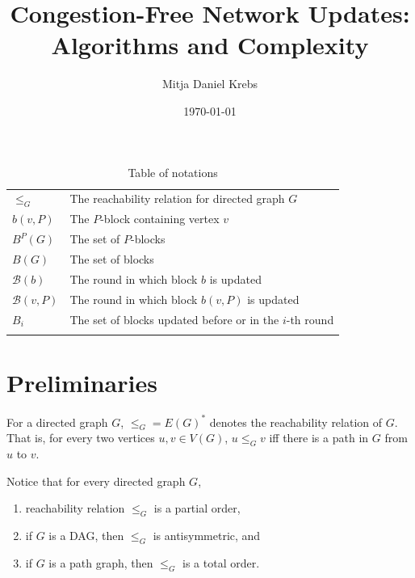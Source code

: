 \documentclass[fontsize=11pt,paper=a4]{book}
\author{Mitja Daniel Krebs}
\date{\today}
\title{Congestion-Free Network Updates: Algorithms and Complexity}
\begin{document}
\maketitle
\tableofcontents

\begin{table}[htbp]
\caption{Table of notations}
\centering
\begin{tabular}{ll}
\hyperref[org1d7d3be]{\(\leq_G\)} & The reachability relation for directed graph \(G\)\\[0pt]
\hyperref[org0c45832]{\(b(v,P)\)} & The \(P\)-block containing vertex \(v\)\\[0pt]
\hyperref[org881382e]{\(B^P(G)\)} & The set of \(P\)-blocks\\[0pt]
\hyperref[org096be0d]{\(B(G)\)} & The set of blocks\\[0pt]
\hyperref[orgdbe2a03]{\(\mathcal{B}(b)\)} & The round in which block \(b\) is updated\\[0pt]
\hyperref[orgdc3d476]{\(\mathcal{B}(v,P)\)} & The round in which block \(b(v,P)\) is updated\\[0pt]
\hyperref[org94a692e]{\(B_i\)} & The set of blocks updated before or in the \(i\)-th round\\[0pt]
 & \\[0pt]
\end{tabular}
\end{table}

\part{Preliminaries}
\label{sec:orgce88fd0}

\begin{notation}
For a directed graph \(G\), \(\leq_G=E(G)^*\) denotes the reachability relation of \(G\).
That is, for every two vertices \(u,v\in V(G)\), \(u\leq_Gv\) iff there is a path in \(G\) from \(u\) to \(v\).
\label{org1d7d3be}
\end{notation}

Notice that for every directed graph \(G\),

\begin{enumerate}
\item reachability relation \(\leq_G\) is a partial order,

\item if \(G\) is a DAG, then \(\leq_G\) is antisymmetric, and

\item if \(G\) is a path graph, then \(\leq_G\) is a total order.
\end{enumerate}
\end{document}
